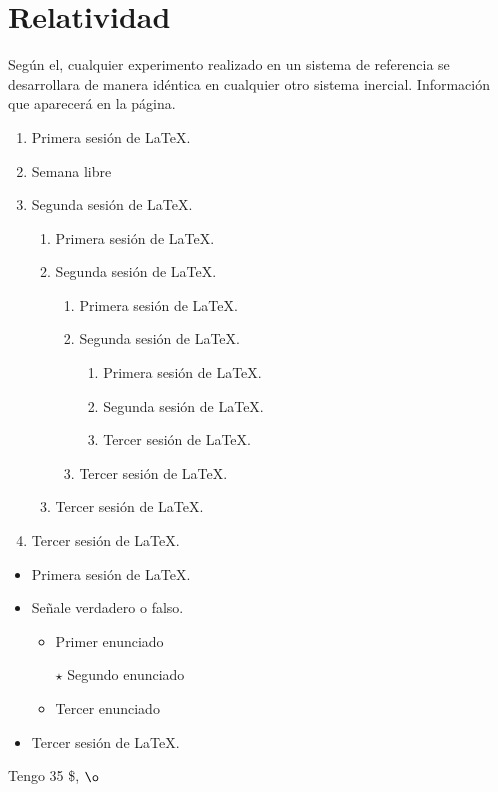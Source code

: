 \section{Relatividad}
Según el, cualquier experimento realizado en un sistema de {\sc referencia}  se desarrollara de manera idéntica en cualquier otro sistema inercial. Información que aparecerá en la página.\begin{enumerate}
\item Primera sesión de \LaTeX.
\item Semana libre
\item Segunda sesión de \LaTeX.\begin{enumerate}
	\item Primera sesión de \LaTeX.
	\item Segunda sesión de \LaTeX.\begin{enumerate}
	\item Primera sesión de \LaTeX.
	\item Segunda sesión de \LaTeX.\begin{enumerate}
	\item Primera sesión de \LaTeX.
	\item Segunda sesión de \LaTeX.
	\item Tercer sesión de \LaTeX.
\end{enumerate}
	\item Tercer sesión de \LaTeX.
\end{enumerate}
	\item Tercer sesión de \LaTeX.
\end{enumerate}
\item Tercer sesión de \LaTeX.
\end{enumerate}

\begin{itemize}
	\item Primera sesión de \LaTeX.
	\item Señale verdadero o falso.\begin{itemize}
	\item Primer enunciado
	\item[$\star$] Segundo enunciado
	\item Tercer enunciado
	\end{itemize}
	\item Tercer sesión de \LaTeX.
\end{itemize}

Tengo 35 \$, $\o$
 
\begin{center}
\end{center}

